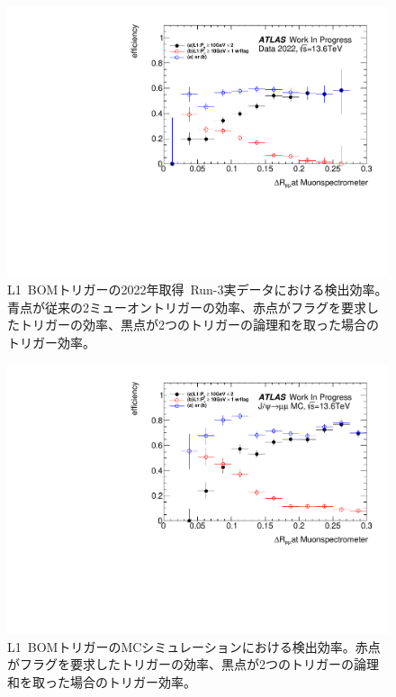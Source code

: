 \begin{figure}[H]
    \centering
    \includegraphics[clip, width=12cm]{fig/4/BOM_eff.pdf}
    \caption{L1~BOMトリガーの2022年取得~Run-3実データにおける検出効率。青点が従来の2ミューオントリガーの効率、赤点がフラグを要求したトリガーの効率、黒点が2つのトリガーの論理和を取った場合のトリガー効率。}
    \label{fig:L1BOMEffData}
\end{figure}

\begin{figure}[H]
    \centering
    \includegraphics[clip, width=12cm]{fig/4/BOM_MC_eff.pdf}
    \caption{L1~BOMトリガーのMCシミュレーションにおける検出効率。赤点がフラグを要求したトリガーの効率、黒点が2つのトリガーの論理和を取った場合のトリガー効率。}
    \label{fig:L1BOMEffMC}
\end{figure}

